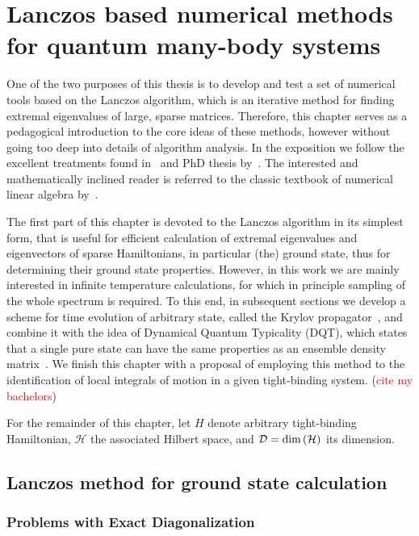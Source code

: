 \chapter{Lancz{o}s based numerical methods for quantum many-body systems}
\thispagestyle{chapterBeginStyle}

One of the two purposes of this thesis is to develop and test a set of numerical tools based on the Lancz{o}s algorithm,
which is an iterative method for finding extremal eigenvalues of large, sparse matrices. Therefore, this chapter serves as a
pedagogical introduction to the core ideas of these methods, however without going too deep into details of algorithm analysis.
In the exposition we follow the excellent treatments found in~\textcite{Sandvik2010} and PhD thesis by~\textcite{Crivelli2016}.
The interested and mathematically inclined reader is referred to the classic textbook of numerical linear algebra by~\textcite{Trefethen1997}.

The first part of this chapter is devoted to the Lancz{o}s algorithm in its simplest form, that is useful for efficient calculation
of extremal eigenvalues and eigenvectors of sparse Hamiltonians, in particular (the) ground state, thus for determining their
ground state properties.
However, in this work we are mainly interested in infinite temperature calculations, for which in principle sampling of the whole
spectrum is required.
To this end, in subsequent sections we develop a scheme for time evolution of arbitrary state, called the Krylov propagator~\autocite{Park1986},
 and combine it with the idea of Dynamical Quantum Typicality (DQT), which states that a single pure state can have the same
 properties as an ensemble density matrix~\autocite{Gemmer2003,Goldstein2006,Popescu2006}.
We finish this chapter with a proposal of employing this method to the identification of local integrals of motion in a given
tight-binding system.
 (\textcolor{red}{cite my bachelors})

 For the remainder of this chapter, let \(H\) denote arbitrary tight-binding Hamiltonian, \(\mathcal{H}\) the associated Hilbert space,
 and \(\mathcal{D} = \textrm{dim}\left(\mathcal{H}\right)\) its dimension.


\section{Lanczos method for ground state calculation}

\subsection{Problems with Exact Diagonalization}

